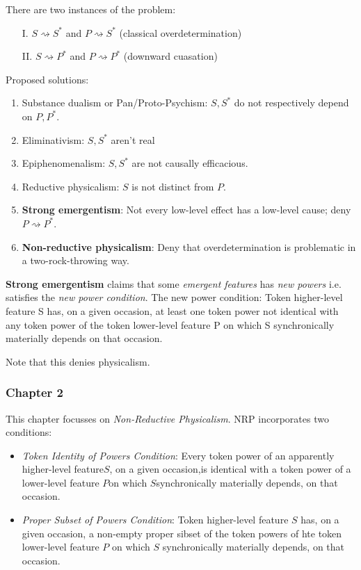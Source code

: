 \documentclass{article}
\newcommand{\ti}[1]{\textit{#1}}
\newcommand{\tb}[1]{\textbf{#1}}
\begin{document}
There are two instances of the problem:
\begin{enumerate}
    \item[I.] $S \rightsquigarrow S^*$ and $P \rightsquigarrow S^*$ (classical overdetermination)
    \item[II.] $S \rightsquigarrow P^*$ and $P \rightsquigarrow P^*$ (downward cuasation)
\end{enumerate}

Proposed solutions:
\begin{enumerate}
    \item Substance dualism or Pan/Proto-Psychism: $S, S^*$ do not respectively depend on $P, P^*$.
    \item Eliminativism: $S, S^*$ aren't real
    \item Epiphenomenalism: $S, S^*$ are not causally efficacious.
    \item Reductive physicalism: $S$ is not distinct from $P$.
    \item \tb{Strong emergentism}: Not every low-level effect has a low-level cause; deny $P \rightsquigarrow P^*$.
    \item \tb{Non-reductive physicalism}: Deny that overdetermination is problematic in a two-rock-throwing way.
\end{enumerate}

\tb{Strong emergentism} claims that some \ti{emergent features} has \ti{new powers} i.e. satisfies the \ti{new power condition}. The new power condition: Token higher-level feature S has, on a given occasion, at least one token power not identical with any token power of the token lower-level feature P on which S synchronically materially depends on that occasion.

Note that this denies physicalism.

\subsubsection*{Chapter 2}

This chapter focusses on \ti{Non-Reductive Physicalism}. NRP incorporates two conditions:

\begin{itemize}
    \item \ti{Token Identity of Powers Condition}: Every token power of an apparently higher-level feature​ $S$​, on a given occasion,is identical with a token power of a lower-level feature $P$​ ​on which $S$​ ​synchronically materially depends, on that occasion.
    \item \ti{Proper Subset of Powers Condition}: Token higher-level feature $S$ has, on a given occasion, a non-empty proper sibset of the token powers of hte token lower-level feature $P$ on which $S$ synchronically materially depends, on that occasion.
\end{itemize}
\end{document}
